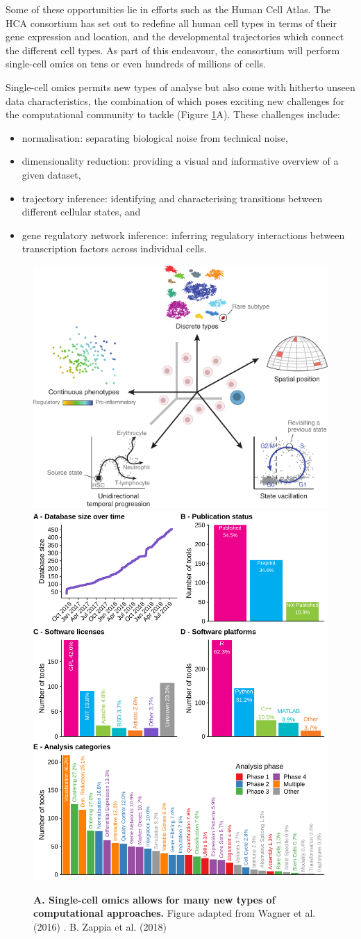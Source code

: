 Some of these opportunities lie in efforts such as the Human Cell Atlas. The HCA consortium has set out to redefine all human cell types in terms of their gene expression and location, and the developmental trajectories which connect the different cell types. As part of this endeavour, the consortium will perform single-cell omics on tens or even hundreds of millions of cells.

Single-cell omics permits new types of analyse but also come with hitherto unseen data characteristics, the combination of which poses exciting new challenges for the computational community to tackle (Figure \ref{fig:comp_tools}A)\cite{stegle_computationalanalyticalchallenges_2015,yuan_challengesemergingdirections_2017,chen_singlecellrnaseqtechnologies_2019}. These challenges include:
\begin{itemize}
  \item normalisation: separating biological noise from technical noise,
  \item dimensionality reduction: providing a visual and informative overview of a given dataset, 
  \item trajectory inference: identifying and characterising transitions between different cellular states, and
  \item gene regulatory network inference: inferring regulatory interactions between transcription factors across individual cells.
\end{itemize}

\begin{figure}[htb!]
  \centering\includegraphics[width=.5\linewidth]{fig/singlecell_tools}
  \centering\includegraphics[width=.3\linewidth]{fig/scrnatools}
  \caption{\textbf{A. Single-cell omics allows for many new types of computational approaches.} Figure adapted from Wagner et al. (2016) \cite{wagner_revealingvectorscellular_2016}.
    B. Zappia et al. (2018) \cite{zappia_exploringsinglecellrnaseq_2018}
  }
  \label{fig:comp_tools}
\end{figure}


